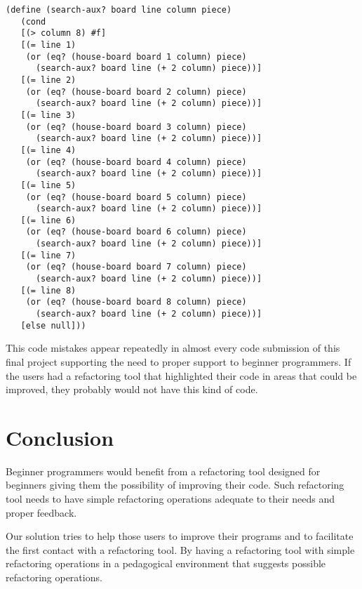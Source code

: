 \begin{lstlisting}[basicstyle=\ttfamily]
  (define (search-aux? board line column piece)
   (cond
   [(> column 8) #f]
   [(= line 1)
    (or (eq? (house-board board 1 column) piece)
      (search-aux? board line (+ 2 column) piece))]
   [(= line 2)
    (or (eq? (house-board board 2 column) piece)
      (search-aux? board line (+ 2 column) piece))]
   [(= line 3)
    (or (eq? (house-board board 3 column) piece)
      (search-aux? board line (+ 2 column) piece))]
   [(= line 4)
    (or (eq? (house-board board 4 column) piece)
      (search-aux? board line (+ 2 column) piece))]
   [(= line 5)
    (or (eq? (house-board board 5 column) piece)
      (search-aux? board line (+ 2 column) piece))]
   [(= line 6)
    (or (eq? (house-board board 6 column) piece)
      (search-aux? board line (+ 2 column) piece))]
   [(= line 7)
    (or (eq? (house-board board 7 column) piece)
      (search-aux? board line (+ 2 column) piece))]
   [(= line 8)
    (or (eq? (house-board board 8 column) piece)
      (search-aux? board line (+ 2 column) piece))]
   [else null]))
\end{lstlisting}







This code mistakes appear repeatedly in almost every code submission of this final project supporting the need to
proper support to beginner programmers.
If the users had a refactoring tool that highlighted their code in areas that
could be improved, they probably would not have this kind of code.


\section{Conclusion}
Beginner programmers would benefit from a refactoring tool designed for beginners
giving them the possibility of improving their code. Such refactoring tool needs
to have simple refactoring operations adequate to their needs and proper feedback.

Our solution tries to help those users to improve their programs and to facilitate
the first contact with a refactoring tool.
By having a refactoring tool with simple refactoring operations in a pedagogical environment
that suggests possible refactoring operations.

